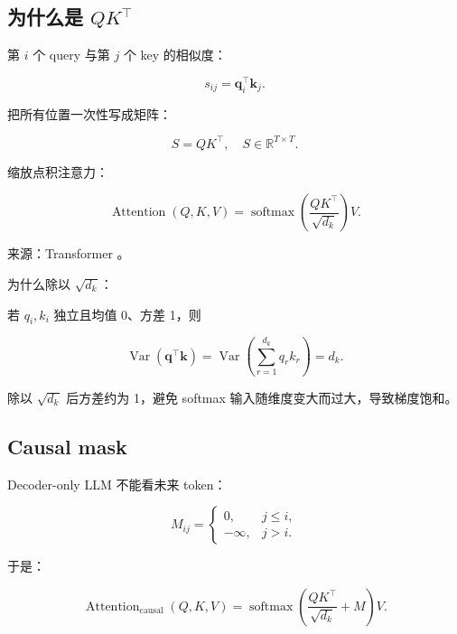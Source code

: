 \documentclass[UTF8,12pt]{ctexart}
\newcommand{\R}{\mathbb{R}}
\newcommand{\1}{\mathbf{1}}
\newcommand{\softmax}{\operatorname{softmax}}
\newcommand{\Attn}{\operatorname{Attention}}
\begin{document}
\subsection{为什么是 $QK^\top$}

第 $i$ 个 query 与第 $j$ 个 key 的相似度：

\begin{equation}
s_{ij}=\bm{q}_i^\top \bm{k}_j.
\end{equation}

把所有位置一次性写成矩阵：

\begin{equation}
S=QK^\top,\quad S\in\R^{T\times T}.
\end{equation}

缩放点积注意力：

\begin{equation}
\Attn(Q,K,V)
=\softmax\left(\frac{QK^\top}{\sqrt{d_k}}\right)V.
\label{eq:scaled-dot-product-attention}
\end{equation}

来源：Transformer \cite{vaswani2017attention}。

为什么除以 $\sqrt{d_k}$：

若 $q_i,k_i$ 独立且均值 0、方差 1，则

\begin{equation}
\operatorname{Var}(\bm{q}^\top\bm{k})
=\operatorname{Var}\left(\sum_{r=1}^{d_k}q_r k_r\right)
=d_k.
\end{equation}

除以 $\sqrt{d_k}$ 后方差约为 1，避免 softmax 输入随维度变大而过大，导致梯度饱和。

\subsection{Causal mask}

Decoder-only LLM 不能看未来 token：

\begin{equation}
M_{ij}=
\begin{cases}
0, & j\le i,\\
-\infty, & j>i.
\end{cases}
\end{equation}

于是：

\begin{equation}
\Attn_{\mathrm{causal}}(Q,K,V)
=\softmax\left(\frac{QK^\top}{\sqrt{d_k}}+M\right)V.
\label{eq:causal-attention}
\end{equation}
\end{document}
